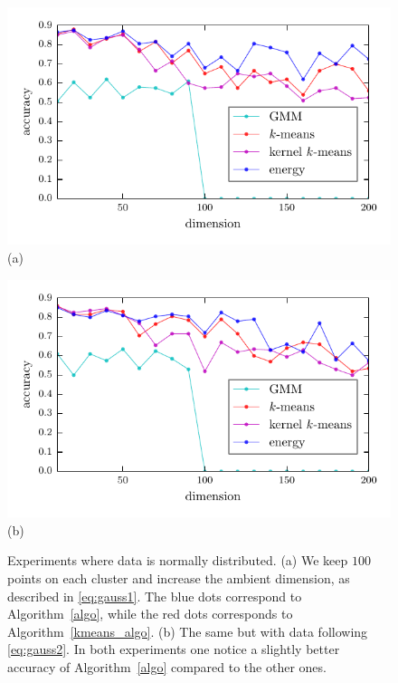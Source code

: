 \documentclass[aps,preprint,nofootinbib,floatfix]{revtex4-1}
\begin{document}
\begin{figure}
\begin{minipage}{0.49\textwidth}
\centering
\includegraphics[width=1\textwidth]{gauss_dim.pdf}\\[-.8em]
(a)
\end{minipage}
\begin{minipage}{0.49\textwidth}
\centering
\includegraphics[width=1\textwidth]{gauss_cov.pdf}\\[-.8em]
(b)
\end{minipage}
\caption{
\label{fig:gauss}
Experiments where data is normally distributed.
(a) We keep $100$ points on each cluster
and increase the ambient dimension, as described in \eqref{eq:gauss1}. The blue
dots correspond to Algorithm~\ref{algo}, while
the red dots 
corresponds to Algorithm~\ref{kmeans_algo}.
(b) The same but with data following \eqref{eq:gauss2}.
In both experiments one notice a slightly better accuracy
of Algorithm~\ref{algo} compared to the other ones.
}
\end{figure}
\end{document}
